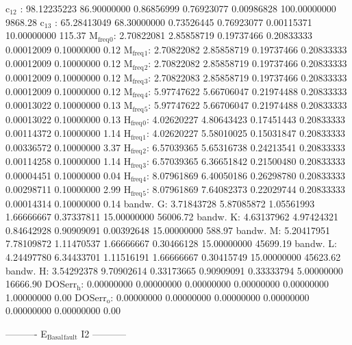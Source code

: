 \documentclass[11pt]{article}
\begin{document}
c\(_{\text{12}}\)    :  98.12235223  86.90000000   0.86856999   0.76923077   0.00986828 100.00000000      9868.28
c\(_{\text{13}}\)    :  65.28413049  68.30000000   0.73526445   0.76923077   0.00115371  10.00000000       115.37
M\(_{\text{freq}}\)\(_{\text{0}}\):   2.70822081   2.85858719   0.19737466   0.20833333   0.00012009   0.10000000         0.12
M\(_{\text{freq}}\)\(_{\text{1}}\):   2.70822082   2.85858719   0.19737466   0.20833333   0.00012009   0.10000000         0.12
M\(_{\text{freq}}\)\(_{\text{2}}\):   2.70822082   2.85858719   0.19737466   0.20833333   0.00012009   0.10000000         0.12
M\(_{\text{freq}}\)\(_{\text{3}}\):   2.70822083   2.85858719   0.19737466   0.20833333   0.00012009   0.10000000         0.12
M\(_{\text{freq}}\)\(_{\text{4}}\):   5.97747622   5.66706047   0.21974488   0.20833333   0.00013022   0.10000000         0.13
M\(_{\text{freq}}\)\(_{\text{5}}\):   5.97747622   5.66706047   0.21974488   0.20833333   0.00013022   0.10000000         0.13
H\(_{\text{freq}}\)\(_{\text{0}}\):   4.02620227   4.80643423   0.17451443   0.20833333   0.00114372   0.10000000         1.14
H\(_{\text{freq}}\)\(_{\text{1}}\):   4.02620227   5.58010025   0.15031847   0.20833333   0.00336572   0.10000000         3.37
H\(_{\text{freq}}\)\(_{\text{2}}\):   6.57039365   5.65316738   0.24213541   0.20833333   0.00114258   0.10000000         1.14
H\(_{\text{freq}}\)\(_{\text{3}}\):   6.57039365   6.36651842   0.21500480   0.20833333   0.00004451   0.10000000         0.04
H\(_{\text{freq}}\)\(_{\text{4}}\):   8.07961869   6.40050186   0.26298780   0.20833333   0.00298711   0.10000000         2.99
H\(_{\text{freq}}\)\(_{\text{5}}\):   8.07961869   7.64082373   0.22029744   0.20833333   0.00014314   0.10000000         0.14
bandw. G:   3.71843728   5.87085872   1.05561993   1.66666667   0.37337811  15.00000000     56006.72
bandw. K:   4.63137962   4.97424321   0.84642928   0.90909091   0.00392648  15.00000000       588.97
bandw. M:   5.20417951   7.78109872   1.11470537   1.66666667   0.30466128  15.00000000     45699.19
bandw. L:   4.24497780   6.34433701   1.11516191   1.66666667   0.30415749  15.00000000     45623.62
bandw. H:   3.54292378   9.70902614   0.33173665   0.90909091   0.33333794   5.00000000     16666.90
DOSerr\(_{\text{h}}\):   0.00000000   0.00000000   0.00000000   0.00000000   0.00000000   1.00000000         0.00
DOSerr\(_{\text{o}}\):   0.00000000   0.00000000   0.00000000   0.00000000   0.00000000   0.00000000         0.00

----------     E\(_{\text{Basal}}\)\(_{\text{fault}}\) I2     -----------
\end{document}
